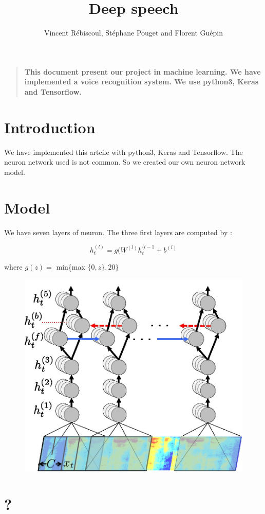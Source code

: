 \documentclass[12pt]{article}
\title{Deep speech}
\author
{Vincent R\'ebiscoul, St\'ephane Pouget and Florent Gu\'epin}
\date{}
\newenvironment{sciabstract}{%
\begin{quote} \bf}
{\end{quote}}
\begin{document}
 


\baselineskip24pt


\maketitle 




\begin{sciabstract}
  This document present our project in machine learning. We have implemented a voice recognition system. We use python3, Keras and Tensorflow.
\end{sciabstract}



\section*{Introduction}

We have implemented this artcile \cite{article} with python3, Keras and Tensorflow. The neuron network used is not common. So we created our own neuron network model.

\section*{Model}
We have seven layers of neuron. The three first layers are computed by :

\[ h_t^{(l)} = g(W^{(l)}h_t^{(l-1} + b^{(l)} \]

where $g(z) =$ min\{max $\{0,z\}, 20\}$

\begin{figure}[H]
\begin{center}
\includegraphics[scale=0.15]{images/photo.jpg}
\end{center}
\end{figure}

\section*{?}




\end{document}
